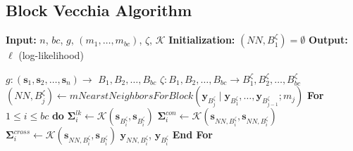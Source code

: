 \documentclass[12pt]{article}
\begin{document}
\subsection{Block Vecchia Algorithm}
\label{spp:alg}
\begin{algorithm}[H]
\caption{Block Vecchia algorithm with clustering using Batched BLAS}\label{alg:blockvecchia-cluster}
\begin{algorithmic}[1]
\State \textbf{Input:} $n$, $bc$, $g$, $(m_1, \ldots, m_{bc})$, $\zeta$, $\mathcal{K}$
\State \textbf{Initialization:} $(NN, B^{\zeta}_1) = \emptyset$
\State \textbf{Output:} $\ell$ (log-likelihood)

\State {}
\State $g:(\boldsymbol{s}_1, \boldsymbol{s}_2, \ldots, \boldsymbol{s}_n) \rightarrow$ $B_1, B_2, \ldots, B_{bc}$ 
\State $\zeta: B_1, B_2, \ldots, B_{bc} \rightarrow B^\zeta_1, B^\zeta_2, \ldots, B^\zeta_{bc}$ 
 
\State $(NN, B^{\zeta}_{j}) \gets mNearstNeighborsForBlock(\boldsymbol{y}_{B^\zeta_j} \mid \boldsymbol{y}_{B^\zeta_1}, \ldots,\boldsymbol{y}_{B^\zeta_{j-1}}; m_j)$
\EndWhile
\State
\textbf{For} $1\leq i \leq bc$ \textbf{do} 
\State \;\;\;\; $\bm \Sigma^{lk}_{i} \gets \mathcal{K}(\boldsymbol{s}_{B^\zeta_i}, \boldsymbol{s}_{B^\zeta_i})$
\State \;\;\;\; $\bm \Sigma^{con}_i \gets \mathcal{K}(\boldsymbol{s}_{NN, B^{\zeta}_i}, \boldsymbol{s}_{NN, B^{\zeta}_i})$
\State \;\;\;\; $\bm \Sigma^{cross}_i \gets \mathcal{K}(\boldsymbol{s}_{NN, B^{\zeta}_i}, \boldsymbol{s}_{B^\zeta_i})$ 
\State \;\;\;\; $\boldsymbol{y}_{NN, B^{\zeta}_i}$, $\boldsymbol{y}_{B^\zeta_i}$ 
\State
\textbf{End For}


\end{algorithmic}
\end{algorithm}
\end{document}
